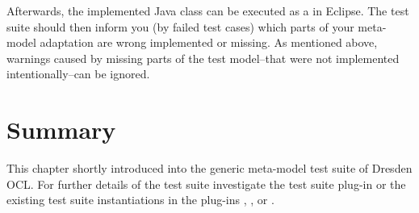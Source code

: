 Afterwards, the implemented Java class can be executed as a  in Eclipse. The test suite should then inform you (by failed test 
cases) which parts of your meta-model adaptation are wrong implemented or
missing. As mentioned above, warnings caused by missing parts of the test 
model--that were not implemented intentionally--can be ignored.


\section{Summary}

This chapter shortly introduced into the generic meta-model test suite of 
Dresden OCL. For further details of the test suite investigate the test suite
plug-in
 or
the existing test suite instantiations in the plug-ins , 
, or 
.
